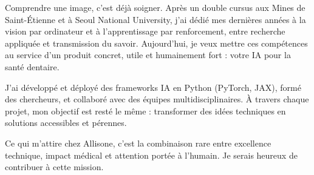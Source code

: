
\newcommand{\Company}{Allisone}
\recipient{\RecruitmentTeam{\Company}}{\Company\\Paris\\France}
\date{22 avril 2025}
\makelettertitle
Comprendre une image, c’est déjà soigner. Après un double cursus aux Mines de Saint-Étienne et à Seoul National University, j’ai dédié mes dernières années à la vision par ordinateur et à l’apprentissage par renforcement, entre recherche appliquée et transmission du savoir. Aujourd’hui, je veux mettre ces compétences au service d’un produit concret, utile et humainement fort : votre IA pour la santé dentaire.

J’ai développé et déployé des frameworks IA en Python (PyTorch, JAX), formé des chercheurs, et collaboré avec des équipes multidisciplinaires. À travers chaque projet, mon objectif est resté le même : transformer des idées techniques en solutions accessibles et pérennes.

Ce qui m’attire chez Allisone, c’est la combinaison rare entre excellence technique, impact médical et attention portée à l’humain. Je serais heureux de contribuer à cette mission.

\makeletterclosing
